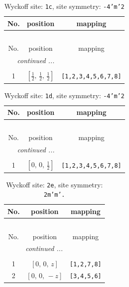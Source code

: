 \documentclass[fleqn,8pt]{jsarticle}
\begin{document}
\begin{longtable}{ccc}
\caption{Wyckoff site: {\tt 1c}, site symmetry: {\tt -4'm'2}}
 \\
 \hline \hline
No. & position & mapping \\ \hline \endfirsthead

\multicolumn{2}{l}{\tablename\ \thetable{}} \\
 \hline \hline
No. & position & mapping \\ \hline \endhead

 \hline \hline
\multicolumn{2}{r}{\footnotesize\it continued ...} \\ \endfoot

 \hline \hline
\multicolumn{2}{r}{} \\ \endlastfoot

1 & $\left[ \frac{1}{2},\, \frac{1}{2},\, \frac{1}{2} \right]$ & {\tt [1,2,3,4,5,6,7,8]} \\
\end{longtable}
\renewcommand{\arraystretch}{1.2}
\begin{longtable}{ccc}
\caption{Wyckoff site: {\tt 1d}, site symmetry: {\tt -4'm'2}}
 \\
 \hline \hline
No. & position & mapping \\ \hline \endfirsthead

\multicolumn{2}{l}{\tablename\ \thetable{}} \\
 \hline \hline
No. & position & mapping \\ \hline \endhead

 \hline \hline
\multicolumn{2}{r}{\footnotesize\it continued ...} \\ \endfoot

 \hline \hline
\multicolumn{2}{r}{} \\ \endlastfoot

1 & $\left[ 0,\, 0,\, \frac{1}{2} \right]$ & {\tt [1,2,3,4,5,6,7,8]} \\
\end{longtable}
\renewcommand{\arraystretch}{1.2}
\begin{longtable}{ccc}
\caption{Wyckoff site: {\tt 2e}, site symmetry: {\tt 2m'm'.}}
 \\
 \hline \hline
No. & position & mapping \\ \hline \endfirsthead

\multicolumn{2}{l}{\tablename\ \thetable{}} \\
 \hline \hline
No. & position & mapping \\ \hline \endhead

 \hline \hline
\multicolumn{2}{r}{\footnotesize\it continued ...} \\ \endfoot

 \hline \hline
\multicolumn{2}{r}{} \\ \endlastfoot

1 & $\left[ 0,\, 0,\, z \right]$ & {\tt [1,2,7,8]} \\ \hline
2 & $\left[ 0,\, 0,\, - z \right]$ & {\tt [3,4,5,6]} \\
\end{longtable}
\end{document}
